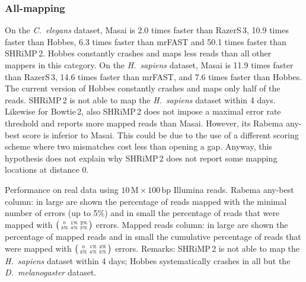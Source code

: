\subsubsection{All-mapping}
On the \emph{C.~elegans} dataset, Masai is 2.0 times faster than RazerS\,3, 10.9 times faster than Hobbes, 6.3 times faster than mrFAST and 50.1 times faster than SHRiMP\,2.
Hobbes constantly crashes and maps less reads than all other mappers in this category.
On the \emph{H.~sapiens} dataset, Masai is 11.9 times faster than RazerS\,3, 14.6 times faster than mrFAST, and 7.6 times faster than Hobbes.
The current version of Hobbes constantly crashes and maps only half of the reads.
SHRiMP\,2 is not able to map the \emph{H.~sapiens} dataset within 4 days.
Likewise for Bowtie\,2, also SHRiMP\,2 does not impose a maximal error rate threshold and reports more mapped reads than Masai.
However, its Rabema any-best score is inferior to Masai.
This could be due to the use of a different scoring scheme where two mismatches cost less than opening a gap.
Anyway, this hypothesis does not explain why SHRiMP\,2 does not report some mapping locations at distance 0.

\begin{table*}[t]
  \caption[Masai performance on real data]{
    \label{tab:masai:runtime}
    Performance on real data using $10\,\text{M}\times 100\,\text{bp}$ Illumina reads.
	Rabema any-best column: in large are shown the percentage of reads mapped with the minimal number of errors (up to 5\%) and in small the percentage of reads that were mapped with $\bigl(\begin{smallmatrix}\mbox{\tiny 0}&\mbox{\tiny 1\%}&\mbox{\tiny 2\%}\\\mbox{\tiny 3\%}&\mbox{\tiny 4\%}&\mbox{\tiny 5\%}\end{smallmatrix}\bigr)$ errors. Mapped reads column: in large are shown the percentage of mapped reads and in small the cumulative percentage of reads that were mapped with $\bigl(\begin{smallmatrix}\mbox{\tiny 0}&\mbox{\tiny 1\%}&\mbox{\tiny 2\%}\\\mbox{\tiny 3\%}&\mbox{\tiny 4\%}&\mbox{\tiny 5\%}\end{smallmatrix}\bigr)$ errors.
	Remarks: SHRiMP\,2 is not able to map the \emph{H.~sapiens} dataset within 4 days; Hobbes systematically crashes in all but the \emph{D.~melanogaster} dataset.
  }
	\vspace{-3mm}
	\center
	\sffamily
	\resizebox{1.0\textwidth}{!}
	{
		\renewcommand{\tabcolsep}{0.8ex}
		
	}
\end{table*}


